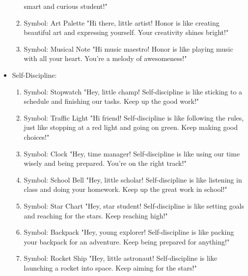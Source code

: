 \documentclass[11pt]{article}
\begin{document}
\begin{itemize}
\begin{enumerate}
smart and curious student!"
\item Symbol: Art Palette
"Hi there, little artist! Honor is like creating beautiful art and expressing
yourself. Your creativity shines bright!"
\item Symbol: Musical Note
"Hi music maestro! Honor is like playing music with all your heart. You're a
melody of awesomeness!"
\end{enumerate}
\item Self-Discipline:
\begin{enumerate}
\item Symbol: Stopwatch
"Hey, little champ! Self-discipline is like sticking to a schedule and finishing
our tasks. Keep up the good work!"
\item Symbol: Traffic Light
"Hi friend! Self-discipline is like following the rules, just like stopping at a
red light and going on green. Keep making good choices!"
\item Symbol: Clock
"Hey, time manager! Self-discipline is like using our time wisely and being
prepared. You're on the right track!"
\item Symbol: School Bell
"Hey, little scholar! Self-discipline is like listening in class and doing your
homework. Keep up the great work in school!"
\item Symbol: Star Chart
"Hey, star student! Self-discipline is like setting goals and reaching for the
stars. Keep reaching high!"
\item Symbol: Backpack
"Hey, young explorer! Self-discipline is like packing your backpack for an
adventure. Keep being prepared for anything!"
\item Symbol: Rocket Ship
"Hey, little astronaut! Self-discipline is like launching a rocket into space.
Keep aiming for the stars!"
\end{enumerate}
\end{itemize}
\end{document}
